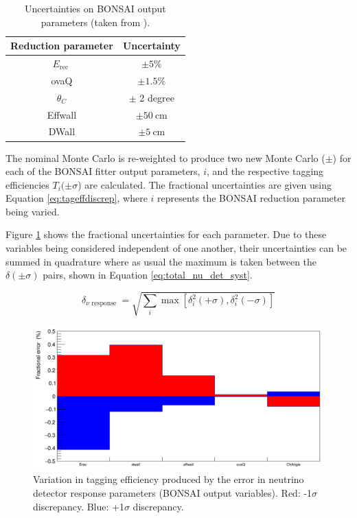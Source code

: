\begin{table}
    \centering
    \begin{tabular}{||cc||}
        \hline Reduction parameter & Uncertainty \\
        \hline$E_{\text {rec }}$ & $\pm 5 \%$ \\
        ovaQ & $\pm 1.5 \%$ \\
        $\theta_C$ & $\pm$ 2 degree \\
        Effwall & $\pm 50 \mathrm{~cm}$ \\
        DWall & $\pm 5 \mathrm{~cm}$ \\
        \hline
        \end{tabular}
\caption{Uncertainties on BONSAI output parameters (taken from \cite{tn_374}).}
\label{table:det_resp_nu_errors}
\end{table}

The nominal Monte Carlo is re-weighted to produce two new Monte Carlo ($\pm$) for each of the BONSAI fitter output parameters, $i$, and the respective tagging efficiencies $T_{i}(\pm\sigma$) are calculated. The fractional uncertainties are given using Equation \ref{eq:tageffdiscrep}, where $i$ represents the BONSAI reduction parameter being varied.



Figure \ref{fig:nu_det_syst_error} shows the fractional uncertainties for each parameter. Due to these variables being considered independent of one another, their uncertainties can be summed in quadrature where as usual the maximum is taken between the $\delta(\pm\sigma)$ pairs, shown in Equation \ref{eq:total_nu_det_syst}.

\begin{equation}
    \delta_{\text {$\nu$ response }}=\sqrt{\sum_i \max \left[\delta_i^2(+\sigma), \delta_i^2(-\sigma)\right]}
\label{eq:total_nu_det_syst}
\end{equation}

\begin{figure}[!htb]
    \centering
    \includegraphics[width=\textwidth]{Figures/nu_det_response.png}
    \caption{Variation in tagging efficiency produced by the error in neutrino detector response parameters (BONSAI output variables). Red: -1$\sigma$ discrepancy. Blue: +1$\sigma$ discrepancy. }
    \label{fig:nu_det_syst_error}
\end{figure}

